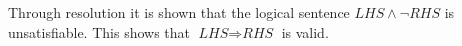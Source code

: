 \begin{enumerate}
\begin{enumerate}
Through resolution it is shown that the logical sentence $\textit{LHS} \land \neg \textit{RHS}$ is unsatisfiable. This shows that $\textit{LHS} \Rightarrow \textit{RHS}$ is valid.

\end{enumerate}


\end{enumerate}



